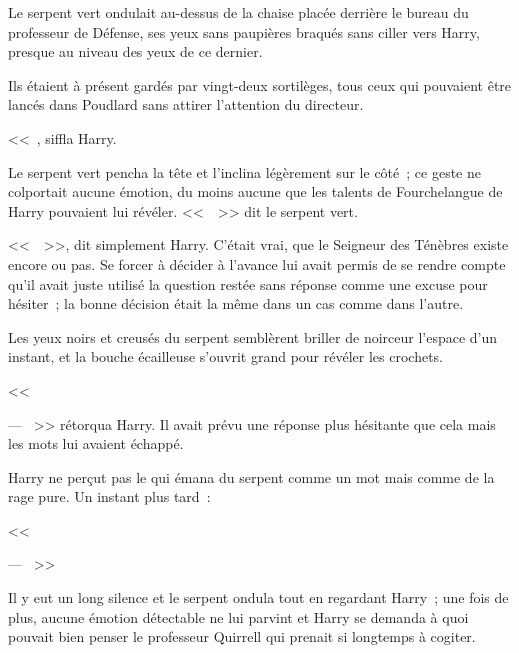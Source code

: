 Le serpent vert ondulait au-dessus de la chaise placée derrière le bureau du professeur de Défense, ses yeux sans paupières braqués sans ciller vers Harry, presque au niveau des yeux de ce dernier.

Ils étaient à présent gardés par vingt-deux sortilèges, tous ceux qui pouvaient être lancés dans Poudlard sans attirer l'attention du directeur.

<<~, siffla Harry.

Le serpent vert pencha la tête et l'inclina légèrement sur le côté~; ce geste ne colportait aucune émotion, du moins aucune que les talents de Fourchelangue de Harry pouvaient lui révéler. <<~~>> dit le serpent vert.

<<~~>>, dit simplement Harry. C'était vrai, que le Seigneur des Ténèbres existe encore ou pas. Se forcer à décider à l'avance lui avait permis de se rendre compte qu'il avait juste utilisé la question restée sans réponse comme une excuse pour hésiter~; la bonne décision était la même dans un cas comme dans l'autre.

Les yeux noirs et creusés du serpent semblèrent briller de noirceur l'espace d'un instant, et la bouche écailleuse s'ouvrit grand pour révéler les crochets.

<<~

--- ~>> rétorqua Harry. Il avait prévu une réponse plus hésitante que cela mais les mots lui avaient échappé.

Harry ne perçut pas le  qui émana du serpent comme un mot mais comme de la rage pure. Un instant plus tard~:

<<~

--- ~>>

Il y eut un long silence et le serpent ondula tout en regardant Harry~; une fois de plus, aucune émotion détectable ne lui parvint et Harry se demanda à quoi pouvait bien penser le professeur Quirrell qui prenait si longtemps à cogiter.

